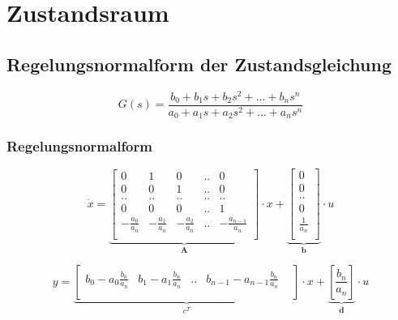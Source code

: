 



\chapter{Zustandsraum}
\section{Regelungsnormalform der Zustandsgleichung}
\[
	G(s)= \frac{b_0+b_1s+b_2s^2+...+b_ns^n}{a_0+a_1s+a_2s^2+...+a_ns^n}
\]
\subsection{Regelungsnormalform}
\[
	\dot x=
	\underbrace{
		\begin{bmatrix}
			0 &	1 & 0 & .. & 0\\
			0 & 0 & 1 & .. & 0\\
			.. & .. & .. &.. & .. \\
			0 & 0 & 0 & .. & 1\\
			-\frac{a_0}{a_n} &-\frac{a_1}{a_n} & -\frac{a_2}{a_n} &.. &-\frac{a_{n-1}}{a_n}\\	
		\end{bmatrix}
	}_{\textbf{A}}
	\cdot x +
	\underbrace{
		\begin{bmatrix}
			0 \\
			0 \\
			.. \\
			0 \\
			\frac{1}{a_n} \\	
		\end{bmatrix}
	}_{\textbf{b}}
	\cdot u	
\]

\[
	y=
	\underbrace{
			\begin{bmatrix}
				b_0-a_0\frac{b_n}{a_n} & b_1-a_1\frac{b_n}{a_n} & .. & b_{n-1}-a_{n-1}\frac{b_n}{a_n} &\\
			\end{bmatrix}
	}_{\textbf{$c^T$}}
	\cdot x  +
	\underbrace{
		\left[ \frac{b_n}{a_n} \right] 
	}_{\textbf{d}}
	\cdot u
\]

